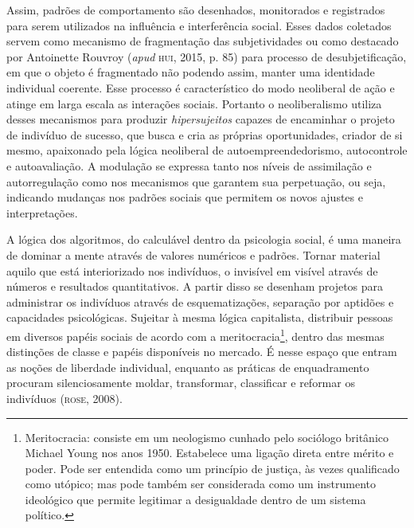 Assim, padrões de comportamento são desenhados, monitorados e
registrados para serem utilizados na influência e interferência social.
Esses dados coletados servem como mecanismo de fragmentação das
subjetividades ou como destacado por Antoinette Rouvroy (\emph{apud} \textsc{hui},
2015, p. 85) para processo de desubjetificação, em que o objeto é
fragmentado não podendo assim, manter uma identidade individual
coerente. Esse processo é característico do modo neoliberal de ação e
atinge em larga escala as interações sociais. Portanto o neoliberalismo
utiliza desses mecanismos para produzir \emph{hipersujeitos} capazes de
encaminhar o projeto de indivíduo de sucesso, que busca e cria as
próprias oportunidades, criador de si mesmo, apaixonado pela lógica
neoliberal de autoempreendedorismo, autocontrole e autoavaliação. A
modulação se expressa tanto nos níveis de assimilação e autorregulação
como nos mecanismos que garantem sua perpetuação, ou seja, indicando
mudanças nos padrões sociais que permitem os novos ajustes e
interpretações.

A lógica dos algoritmos, do calculável dentro da psicologia social, é
uma maneira de dominar a mente através de valores numéricos e padrões.
Tornar material aquilo que está interiorizado nos indivíduos, o
invisível em visível através de números e resultados quantitativos. A
partir disso se desenham projetos para administrar os indivíduos através
de esquematizações, separação por aptidões e capacidades psicológicas.
Sujeitar à mesma lógica capitalista, distribuir pessoas em diversos
papéis sociais de acordo com a meritocracia\footnote{Meritocracia:
  consiste em um neologismo cunhado pelo sociólogo britânico Michael
  Young nos anos 1950. Estabelece uma ligação direta entre mérito e
  poder. Pode ser entendida como um princípio de justiça, às vezes
  qualificado como utópico; mas pode também ser considerada como um
  instrumento ideológico que permite legitimar a desigualdade dentro de
  um sistema político.}, dentro das mesmas distinções de classe e papéis
disponíveis no mercado. É nesse espaço que entram as noções de liberdade
individual, enquanto as práticas de enquadramento procuram
silenciosamente moldar, transformar, classificar e reformar os
indivíduos (\textsc{rose}, 2008).

